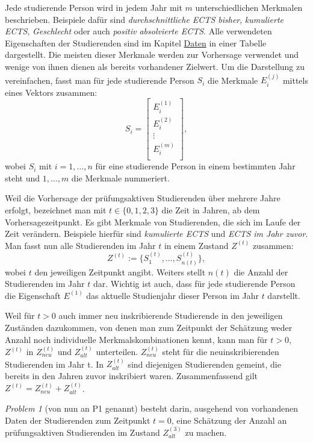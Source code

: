 Jede studierende Person wird in jedem Jahr mit $m$ unterschiedlichen Merkmalen beschrieben. Beispiele daf\"ur sind \textit{\glqq durchschnittliche ECTS bisher\grqq{}},
\textit{\glqq kumulierte ECTS\grqq{}}, \textit{\glqq Geschlecht\grqq{}} oder auch \textit{\glqq positiv absolvierte ECTS\grqq{}}. Alle verwendeten Eigenschaften der
Studierenden sind im Kapitel \hyperref[sec:daten]{Daten} in einer Tabelle dargestellt. Die meisten dieser Merkmale werden zur
Vorhersage verwendet und wenige von ihnen dienen als bereits vorhandener Zielwert. Um die Darstellung zu vereinfachen, fasst man f\"ur
jede studierende Person $S_i$ die Merkmale $E_i^{(j)}$ mittels eines Vektors zusammen:
$$S_i = \begin{bmatrix}
		E_i^{(1)} \\
		E_i^{(2)} \\
		\vdots    \\
		E_i^{(m)} \\
	\end{bmatrix}, $$
wobei $S_i$ mit $i = 1,\dots,n$ f\"ur eine studierende Person in einem bestimmten Jahr steht und $1,\dots,m$ die Merkmale nummeriert.

Weil die Vorhersage der pr\"ufungsaktiven Studierenden \"uber mehrere Jahre erfolgt, bezeichnet man
mit $t \in \{0,1,2,3\}$ die Zeit in Jahren, ab dem Vorhersagezeitpunkt. Es gibt Merkmale von Studierenden, die sich im Laufe der Zeit
ver\"andern. Beispiele hierf\"ur sind \textit{\glqq kumulierte ECTS\grqq{}} und \textit{\glqq ECTS im Jahr zuvor\grqq{}}. Man fasst nun alle
Studierenden im Jahr $t$ in einem Zustand $Z^{(t)}$ zusammen:
$$Z^{(t)} := \{S_1^{(t)}, \dots ,S_{n(t)}^{(t)}\},$$
wobei $t$ den jeweiligen Zeitpunkt angibt. Weiters stellt $n(t)$ die Anzahl der Studierenden im
Jahr $t$ dar. Wichtig ist auch, dass f\"ur jede studierende Person die Eigenschaft $E^{(1)}$ das aktuelle Studienjahr
dieser Person im Jahr $t$ darstellt.

Weil für $t>0$ auch immer neu inskribierende Studierende in den jeweiligen Zuständen dazukommen, von denen man zum Zeitpunkt der Sch\"atzung weder
Anzahl noch individuelle Merkmalskombinationen kennt, kann man für $t>0$, $Z^{(t)}$ in $Z_{neu}^{(t)}$ und $Z_{alt}^{(t)}$ unterteilen.
$Z_{neu}^{(t)}$ steht f\"ur die neuinskribierenden Studierenden im Jahr t.
In $Z_{alt}^{(t)}$ sind diejenigen Studierenden gemeint, die bereits in den Jahren zuvor inskribiert waren.
Zusammenfassend gilt $Z^{(t)} = Z_{neu}^{(t)} + Z_{alt}^{(t)}$.

\textit{Problem 1} (von nun an P1 genannt) besteht darin, ausgehend von vorhandenen Daten der Studierenden zum Zeitpunkt $t = 0$,
eine Sch\"atzung der Anzahl an pr\"ufungsaktiven Studierenden im Zustand $Z_{alt}^{(3)}$ zu machen.

